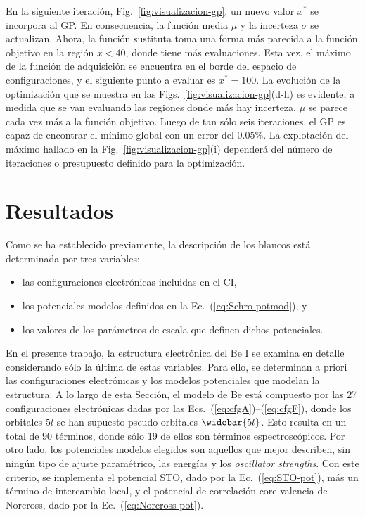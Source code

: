 En la siguiente iteración, Fig.~\ref{fig:visualizacion-gp}, un nuevo 
valor $x^*$ se incorpora al GP. En consecuencia, la función media $\mu$ 
y la incerteza $\sigma$ se actualizan. Ahora, la función sustituta toma
una forma más parecida a la función objetivo en la región $x<40$, donde 
tiene más evaluaciones. Esta vez, el máximo de la función de adquisición
se encuentra en el borde del espacio de configuraciones, y el siguiente 
punto a evaluar es $x^*=100$. La evolución de la optimización que se 
muestra en las Figs.~\ref{fig:visualizacion-gp}(d-h) es evidente, a 
medida que se van evaluando las regiones donde más hay incerteza, $\mu$ 
se parece cada vez más a la función objetivo. Luego de tan sólo seis 
iteraciones, el GP es capaz de encontrar el mínimo global con un error 
del $0.05\%$. La explotación del máximo hallado en la 
Fig.~\ref{fig:visualizacion-gp}(i) dependerá del número de iteraciones 
o presupuesto definido para la optimización. 

\section{Resultados}
\label{sec:results-rmatrix}

Como se ha establecido previamente, la descripción de los blancos está 
determinada por tres variables:
\begin{itemize}
\item las configuraciones electrónicas incluidas en el CI,
\item los potenciales modelos definidos en la 
Ec.~(\ref{eq:Schro-potmod}), y 
\item los valores de los parámetros de escala que definen dichos 
potenciales.
\end{itemize}
En el presente trabajo, la estructura electrónica del Be I se examina en 
detalle considerando sólo la última de estas variables. Para ello, se 
determinan a priori las configuraciones electrónicas y los modelos 
potenciales que modelan la estructura. A lo largo de esta Sección, el 
modelo de Be está compuesto por las 27 configuraciones electrónicas 
dadas por las Ecs.~(\ref{eq:cfgA})--(\ref{eq:cfgF}),
donde los orbitales $5l$ se han supuesto pseudo-orbitales $\widebar{5l}$. 
Esto resulta en un total de 90 términos, donde sólo 19 de ellos son 
términos espectroscópicos. Por otro lado, los potenciales modelos 
elegidos son aquellos que mejor describen, sin ningún tipo de ajuste 
paramétrico, las energías y los \textit{oscillator strengths}. Con este 
criterio, se implementa el potencial STO, dado por la 
Ec.~(\ref{eq:STO-pot}), más un término de intercambio local, y el 
potencial de correlación core-valencia de Norcross, dado por la 
Ec.~(\ref{eq:Norcross-pot}).

